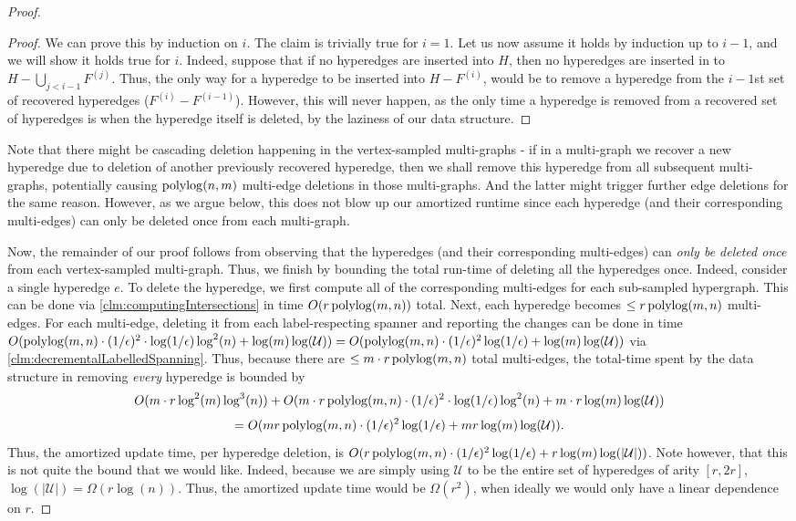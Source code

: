 \documentclass{article}
\begin{document}
\begin{proof}
    \begin{proof}
        We can prove this by induction on $i$. The claim is trivially true for $i = 1$. Let us now assume it holds by induction up to $i-1$, and we will show it holds true for $i$. Indeed, suppose that if no hyperedges are inserted into $H$, then no hyperedges are inserted in to $H - \bigcup_{j < i-1} F^{(j)}$. Thus, the only way for a hyperedge to be inserted into $H - F^{(i)}$, would be to remove a hyperedge from the $i-1$st set of recovered hyperedges ($F^{(i)} -F^{(i-1)} $). However, this will never happen, as the only time a hyperedge is removed from a recovered set of hyperedges is when the hyperedge itself is deleted, by the laziness of our data structure. 
    \end{proof}

Note that there might be cascading deletion happening in the vertex-sampled
    multi-graphs - if in a multi-graph we recover a new hyperedge due to
    deletion of another previously recovered hyperedge, then we shall remove this hyperedge from
    all subsequent multi-graphs, potentially causing $\operatorname{polylog}(n,m)$ multi-edge deletions
    in those multi-graphs. And the latter might trigger further edge deletions for the same
    reason. However, as we argue below, this does not blow up our amortized runtime since
    each hyperedge (and their corresponding multi-edges) can only be deleted once
    from each multi-graph.
    
    Now, the remainder of our proof follows from observing that the hyperedges (and their corresponding multi-edges) can \emph{only be deleted once} from each vertex-sampled multi-graph. Thus, we finish by bounding the total run-time of deleting all the hyperedges once. Indeed, consider a single hyperedge $e$. To delete the hyperedge, we first compute all of the corresponding multi-edges for each sub-sampled hypergraph. This can be done via \cref{clm:computingIntersections} in time $O(r\operatorname{polylog}(m,n))$ total. Next, each hyperedge becomes $\leq r \operatorname{polylog}(m,n)$ multi-edges. For each multi-edge, deleting it from each label-respecting spanner and reporting the changes can be done in time $O(\operatorname{polylog}(m,n) \cdot (1/\epsilon)^2 \cdot \log(1/\epsilon) \log^2(n) + \log(m) \log(\mathcal{U})) = O(\operatorname{polylog}(m,n)  \cdot (1/\epsilon)^2 \log(1/\epsilon)  + \log(m) \log(\mathcal{U}))$ via \cref{clm:decrementalLabelledSpanning}. Thus, because there are $\leq m \cdot r \operatorname{polylog}(m,n)$ total multi-edges, the total-time spent by the data structure in removing \emph{every} hyperedge is bounded by 
    \[
    O(m \cdot r \log^2(m) \log^3(n)) + O(m \cdot r \operatorname{polylog}(m,n) \cdot (1/\epsilon)^2 \cdot \log(1/\epsilon)  \log^2(n) + m \cdot r \log(m) \log(\mathcal{U}))
    \]
    \[
    = O(mr\operatorname{polylog}(m,n) \cdot (1/\epsilon)^2 \log(1/\epsilon)  + mr \log(m)\log(\mathcal{U}) ).
    \]
    Thus, the amortized update time, per hyperedge deletion, is $O(r\operatorname{polylog}(m,n) \cdot (1/\epsilon)^2 \log(1/\epsilon)  + r \log(m)\log(|\mathcal{U}|))$. Note however, that this is not quite the bound that we would like. Indeed, because we are simply using $\mathcal{U}$ to be the entire set of hyperedges of arity $[r, 2r]$, $\log(|\mathcal{U}|) = \Omega(r\log(n))$. Thus, the amortized update time would be $\Omega(r^2)$, when ideally we would only have a linear dependence on $r$. 
    

\end{proof}
\end{document}
